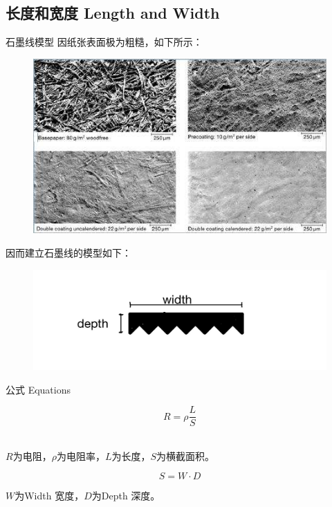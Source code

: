 \documentclass[10pt]{beamer}
\begin{document}
	\subsection{长度和宽度 Length and Width}
	\begin{frame}{石墨线模型}
		因纸张表面极为粗糙，如下所示：
		\begin{figure}
			\centering
			\includegraphics[width=0.5\linewidth]{figs/f3}
			\label{fig:f3}
		\end{figure}
		
		因而建立石墨线的模型如下：
		\begin{figure}
			\centering
			\includegraphics[width=0.5\linewidth]{figs/f4}
			\label{fig:f3}
		\end{figure}
		
	\end{frame}
	\begin{frame}{公式 Equations}
		\begin{theorem}
			$$R=\rho\frac{L}{S}$$ \\
			\begin{center}
				$ R $为电阻，$ \rho $为电阻率，$ L $为长度，$ S $为横截面积。
			\end{center}
		\end{theorem}
		\pause
		\begin{theorem}
			$$ S=W\cdot D $$
			\begin{center}
				$W$为Width 宽度，$ D $为Depth 深度。
			\end{center}
		\end{theorem}
	\end{frame}
	
\end{document}
